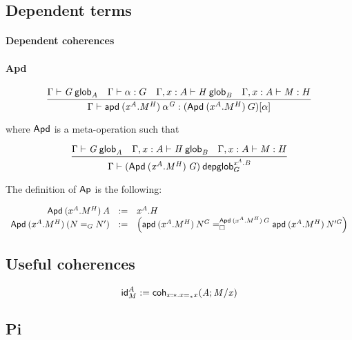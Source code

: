 \subsection{Dependent terms}

\paragraph{Dependent coherences}



\paragraph{Apd}

\begin{small}
  \[\infer{\ofdepglob{\Gamma}{\apd{(x^A.M^H)}{\alpha^G}}
    {(\Apd{(x^A.M^H)}{G})}{\alpha}}
  {\wfglob{\Gamma}{G}{n}{A}
    & \ofglob{\Gamma}{\alpha}{G}
    & \wfglob{\Gamma,x:A}{H}{m}{B}
    & \ofglob{\Gamma,x:A}{M}{H}}\]

  where $\dsd{Apd}$ is a meta-operation such that

  \[\infer{\wfdepglob{\Gamma}{(\Apd{(x^A.M^H)}{G})}{n,m}
    {x^A.B}{G}}
  {\wfglob{\Gamma}{G}{n}{A}
    & \wfglob{\Gamma,x:A}{H}{m}{B}
    & \ofglob{\Gamma,x:A}{M}{H}}\]

  The definition of $\dsd{Ap}$ is the following:

  \[
  \begin{array}{rcl}
    \Apd{(x^A.M^H)}{A} & := & x^A.H \\
    \Apd{(x^A.M^H)}{(\homj{G}{N}{N'})} & := & \left(
      \dhomj{\Apd{(x^A.M^H)}{G}}
      {\apd{(x^A.M^H)}{N^G}}{\apd{(x^A.M^H)}{N'^G}}{\blank}\right)
  \end{array}
  \]
\end{small}


\subsection{Useful coherences}

\[\idt{A}{M}:=\coh{x:\diagbase.\homj{\diagbase}{x}{x}}{A}{M/x}\]

\subsection{Pi}

